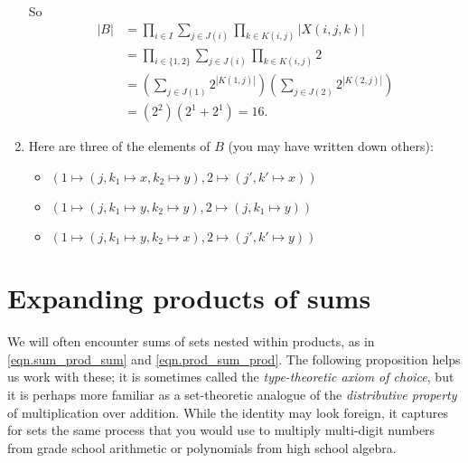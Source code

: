 \documentclass[Book-Poly]{subfiles}
\begin{document}
\begin{exercise}
\begin{solution}
\begin{enumerate}
            So
            \begin{align*}
                |B| &= \prod_{i\in I}\sum_{j\in J(i)}\prod_{k\in K(i,j)}|X(i,j,k)| \\
                &= \prod_{i\in \{1,2\}}\sum_{j\in J(i)}\prod_{k\in K(i,j)}2 \\
                &= \left(\sum_{j\in J(1)} 2^{|K(1,j)|}\right)\left(\sum_{j\in J(2)} 2^{|K(2,j)|}\right) \\
                &= \left(2^2\right)\left(2^1 + 2^1\right) = 16.
            \end{align*}
            \item Here are three of the elements of $B$ (you may have written down others):
            \begin{itemize}
                \item $(1 \mapsto (j, k_1 \mapsto x, k_2 \mapsto y), 2 \mapsto (j', k' \mapsto x))$
                \item $(1 \mapsto (j, k_1 \mapsto y, k_2 \mapsto y), 2 \mapsto (j, k_1 \mapsto y))$
                \item $(1 \mapsto (j, k_1 \mapsto y, k_2 \mapsto x), 2 \mapsto (j', k' \mapsto y))$
            \end{itemize}
            \qedhere
        \end{enumerate}
    \end{solution}
\end{exercise}


\section{Expanding products of sums} \label{sec.poly.rep-sets.expand}


We will often encounter sums of sets nested within products, as in \eqref{eqn.sum_prod_sum} and \eqref{eqn.prod_sum_prod}.
The following proposition helps us work with these; it is sometimes called the \emph{type-theoretic axiom of choice}, but it is perhaps more familiar as a set-theoretic analogue of the \emph{distributive property} of multiplication over addition.
While the identity may look foreign, it captures for sets the same process that you would use to multiply multi-digit numbers from grade school arithmetic or polynomials from high school algebra.
\end{document}
